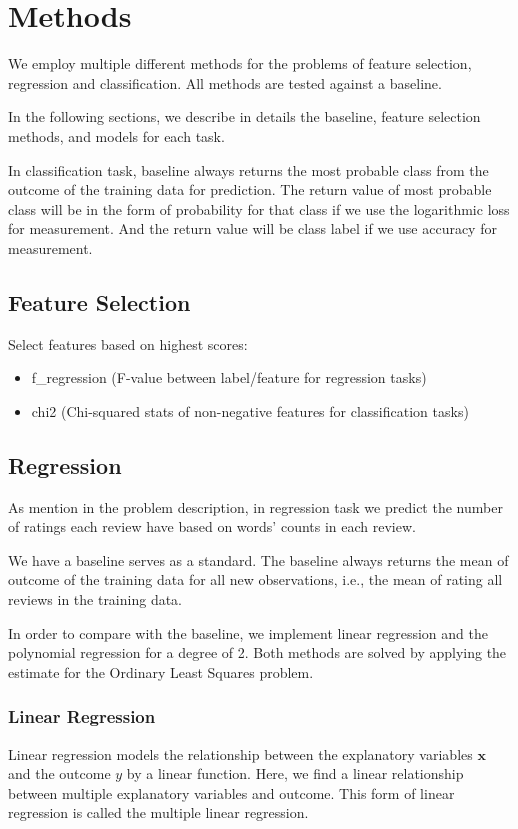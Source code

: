 \section{Methods}
\label{sec:two}

We employ multiple different methods for the problems of feature selection,
regression and classification. All methods are tested against a baseline. 

In the following sections, we describe in details the baseline, feature selection methods, and models for each task. 

 In classification task, baseline always returns the most probable class from the outcome of the training data for prediction. The return value of most probable class will be in the form of probability for that class if we use the logarithmic loss for measurement. And the return value will be class label if we use accuracy for measurement.

\subsection{Feature Selection}

Select features based on highest scores:

\begin{itemize}
\item f\_regression (F-value between label/feature for regression tasks)
\item chi2 (Chi-squared stats of non-negative features for classification tasks)
\end{itemize}

\subsection{Regression}
As mention in the problem description, in regression task we predict the number of ratings each review have based on words' counts in each review.

We have a baseline serves as a standard. The baseline always returns the mean of outcome of the training data for all new observations, i.e., the mean of rating all reviews in the training data.

In order to compare with the baseline, we implement linear regression and the polynomial regression for a degree of 2. Both methods are solved by applying the estimate for the Ordinary Least Squares problem.

\subsubsection{Linear Regression}
Linear regression models the relationship between the explanatory variables $\mathbf{x}$ and the outcome $y$ by a linear function. Here, we find a linear relationship between multiple explanatory variables and outcome. This form of linear regression is called the multiple linear regression.

